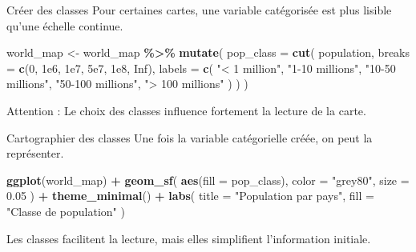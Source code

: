 \documentclass[
  10pt,
  ignorenonframetext,
]{beamer}
\newenvironment{Shaded}{\begin{snugshade}}{\end{snugshade}}
\newcommand{\AttributeTok}[1]{\textcolor[rgb]{0.13,0.29,0.53}{#1}}
\newcommand{\ConstantTok}[1]{\textcolor[rgb]{0.56,0.35,0.01}{#1}}
\newcommand{\DecValTok}[1]{\textcolor[rgb]{0.00,0.00,0.81}{#1}}
\newcommand{\FloatTok}[1]{\textcolor[rgb]{0.00,0.00,0.81}{#1}}
\newcommand{\FunctionTok}[1]{\textcolor[rgb]{0.13,0.29,0.53}{\textbf{#1}}}
\newcommand{\NormalTok}[1]{#1}
\newcommand{\OtherTok}[1]{\textcolor[rgb]{0.56,0.35,0.01}{#1}}
\newcommand{\SpecialCharTok}[1]{\textcolor[rgb]{0.81,0.36,0.00}{\textbf{#1}}}
\newcommand{\StringTok}[1]{\textcolor[rgb]{0.31,0.60,0.02}{#1}}
\begin{document}
\begin{frame}[fragile]{Créer des classes}
\label{cruxe9er-des-classes}
Pour certaines cartes, une variable catégorisée est plus lisible qu'une
échelle continue.

\begin{Shaded}
\begin{Highlighting}[]
\NormalTok{world\_map }\OtherTok{\textless{}{-}}\NormalTok{ world\_map }\SpecialCharTok{\%\textgreater{}\%}
  \FunctionTok{mutate}\NormalTok{(}
    \AttributeTok{pop\_class =} \FunctionTok{cut}\NormalTok{(}
\NormalTok{      population,}
      \AttributeTok{breaks =} \FunctionTok{c}\NormalTok{(}\DecValTok{0}\NormalTok{, }\FloatTok{1e6}\NormalTok{, }\FloatTok{1e7}\NormalTok{, }\FloatTok{5e7}\NormalTok{, }\FloatTok{1e8}\NormalTok{, }\ConstantTok{Inf}\NormalTok{),}
      \AttributeTok{labels =} \FunctionTok{c}\NormalTok{(}
        \StringTok{"\textless{} 1 million"}\NormalTok{,}
        \StringTok{"1{-}10 millions"}\NormalTok{,}
        \StringTok{"10{-}50 millions"}\NormalTok{,}
        \StringTok{"50{-}100 millions"}\NormalTok{,}
        \StringTok{"\textgreater{} 100 millions"}
\NormalTok{      )}
\NormalTok{    )}
\NormalTok{  )}
\end{Highlighting}
\end{Shaded}

Attention : Le choix des classes influence fortement la lecture de la
carte.
\end{frame}

\begin{frame}[fragile]{Cartographier des classes}
\label{cartographier-des-classes}
Une fois la variable catégorielle créée, on peut la représenter.

\begin{Shaded}
\begin{Highlighting}[]
\FunctionTok{ggplot}\NormalTok{(world\_map) }\SpecialCharTok{+}
  \FunctionTok{geom\_sf}\NormalTok{(}
    \FunctionTok{aes}\NormalTok{(}\AttributeTok{fill =}\NormalTok{ pop\_class),}
    \AttributeTok{color =} \StringTok{"grey80"}\NormalTok{,}
    \AttributeTok{size =} \FloatTok{0.05}
\NormalTok{  ) }\SpecialCharTok{+}
  \FunctionTok{theme\_minimal}\NormalTok{() }\SpecialCharTok{+}
  \FunctionTok{labs}\NormalTok{(}
    \AttributeTok{title =} \StringTok{"Population par pays"}\NormalTok{,}
    \AttributeTok{fill =} \StringTok{"Classe de population"}
\NormalTok{  )}
\end{Highlighting}
\end{Shaded}

Les classes facilitent la lecture, mais elles simplifient l'information
initiale.
\end{frame}
\end{document}
